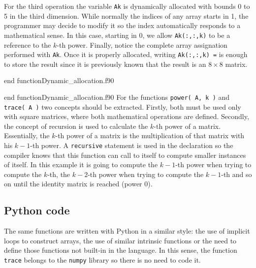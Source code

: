 \newpage
For the third operation the variable \texttt{Ak} is dynamically allocated with bounds 0 to 5 in the third dimension. 
While normally the indices of any array starts in 1, the programmer may decide to modify it 
so the index automatically responds to a mathematical sense.
In this case, starting in 0, we allow \texttt{Ak(:,:,k)} to be a reference to the $k$-th power.
Finally, notice the complete array assignation performed with \texttt{Ak}. 
Once it is properly allocated, writing \texttt{Ak(:,:,k) =} is enough to store the result since it is previously known that the result is an $8\times8$ matrix. 

\vspace{0.5cm}
{end function}{Dynamic_allocation.f90}

{end function}{Dynamic_allocation.f90}
For the functions \texttt{power( A, k )} and \texttt{trace( A )} two concepts should be extracted. 
Firstly, both must be used only with square matrices, where both mathematical operations are defined. 
Secondly, the concept of recursion is used to calculate the $k$-th power of a matrix. 
Essentially, the $k$-th power of a matrix is the multiplication of that matrix with his $k-1$-th power. 
A \texttt{recursive} statement is used in the declaration so the compiler knows that this function can call to itself to compute smaller instances of itself.
In this example it is going to compute the $k-1$-th power when trying to compute the $k$-th, 
the $k-2$-th power when trying to compute the $k-1$-th and so on until the identity matrix is reached (power 0). 



    \newpage
    \subsection*{Python code}
The same functions are written with Python in a similar style:
the use of implicit loops to construct arrays, 
the use of similar intrinsic functions or 
the need to define those functions not built-in in the language.
In this sense, the function \texttt{trace} belongs to the \texttt{numpy} library so there is no need to code it.

